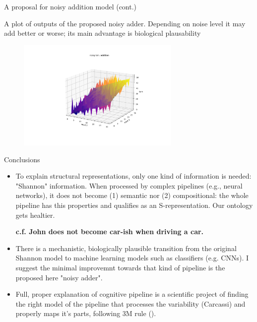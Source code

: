 \documentclass[10pt, aspectratio=169]{beamer}
\begin{document}
    

\begin{frame}{A proposal for noisy addition model (cont.)}
   
    A plot of outputs of the proposed noisy adder. Depending on noise level it may add better or worse; its main advantage is biological plausability
        
        \begin{figure}[h!]
            \centering
            \includegraphics[width=0.7\textwidth]{images/anoisy_adding.png}
            \caption{}
            \label{fig:noisy_adder}
        \end{figure}
    
    
    
    \end{frame}
    


    
    \begin{frame}{Conclusions }
    
        \begin{itemize}
            To explain semantic phenomena is to provide a description of the pipeline that processes the variabilty (Carcassi),  what seems like proper scientific task with some prospect of successes.
          
            \item To explain  structural representations, only one kind of information is needed: "Shannon" information. When processed by complex pipelines (e.g., neural networks), it does not become  (1) semantic nor (2) compositional: the whole pipeline has this properties  and qualifies as an S-representation. Our ontology gets healtier. 
            
\textbf{    c.f. John does not become car-ish when driving a car.
}
            \item There is a mechanistic, biologically plausible transition from the original Shannon model to machine learning models such as classifiers (e.g. CNNs). I suggest the minimal improvemnt towards that kind of pipeline is the proposed here "noisy adder".
            
            \item Full, proper explanation of cognitive pipeline is a scientific project of finding the right model of the pipeline that processes the variability (Carcassi) and properly maps it's parts, following 3M rule (\cite{Craver}).
        \end{itemize}
      
    \end{frame}
    
\end{document}
